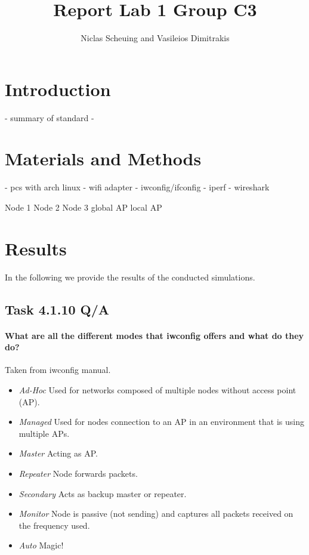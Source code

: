 \documentclass[12pt,a4paper]{article}
\title{Report Lab 1 Group C3}
\author{Niclas Scheuing and Vasileios Dimitrakis}
\begin{document}
\maketitle
\begin{abstract}
\end{abstract}
\section{Introduction}
- summary of standard
- 

\section{Materials and Methods}
- pcs with arch linux
- wifi adapter
- iwconfig/ifconfig
- iperf
- wireshark

Node 1
Node 2
Node 3
global AP
local AP

\section{Results}
In the following we provide the results of the conducted simulations.
\subsection{Task 4.1.10 Q/A}

\paragraph{What are all the different modes that iwconfig offers and what do they do?}
Taken from iwconfig manual\cite{iwconfig:man}.
\begin{itemize}
	\item \emph{Ad-Hoc}
		Used for networks composed of multiple nodes without access point (AP).
	\item \emph{Managed}
		Used for nodes connection to an AP in an environment that is using multiple APs.
	\item \emph{Master}
		Acting as AP.
	\item \emph{Repeater}
		Node forwards packets.
	\item \emph{Secondary}
		Acts as backup master or repeater.
	\item \emph{Monitor}
		Node is passive (not sending) and captures all packets received on the frequency used.
	\item \emph{Auto}
		Magic!
\end{itemize}
\end{document}
